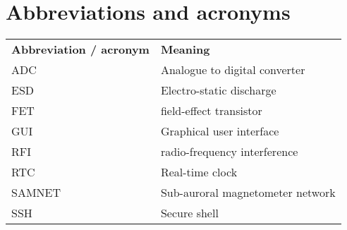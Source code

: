 \chapter{Abbreviations and acronyms}
\begin{table}[!h]
  \begin{center}
    \begin{tabular}{ll}
      \textbf{Abbreviation / acronym} & \textbf{Meaning} \\
      ADC & Analogue to digital converter \\
      ESD & Electro-static discharge\\
      FET & field-effect transistor\\
      GUI & Graphical user interface\\
      RFI & radio-frequency interference\\
      RTC & Real-time clock\\
      SAMNET & Sub-auroral magnetometer network\\
      SSH & Secure shell\\
    \end{tabular}
    \label{tab:-abbreviations}
  \end{center}
\end{table}
